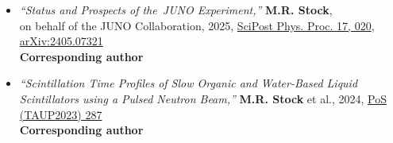 \documentclass[letterpaper,12pt, oneside]{article}
\begin{document}
\begin{itemize}
	\item {\textit{“Status and Prospects of the~JUNO Experiment,”}} \textbf{M.R. Stock}, \\on behalf of the JUNO Collaboration, 2025, \href{https://doi.org/10.21468/SciPostPhysProc.17.020}{SciPost Phys. Proc. 17, 020}, \href{https://doi.org/10.48550/arXiv.2405.07321}{arXiv:2405.07321}\\
	\textbf{Corresponding author}

	\item {\textit{“Scintillation Time Profiles of Slow Organic and Water-Based Liquid Scintillators using a Pulsed Neutron Beam,”}} \textbf{M.R. Stock} et al., 2024, \href{https://pos.sissa.it/441/287/}{PoS (TAUP2023) 287}\\
	\textbf{Corresponding author}
\end{itemize}
\vspace{1em}\par
\end{document}
